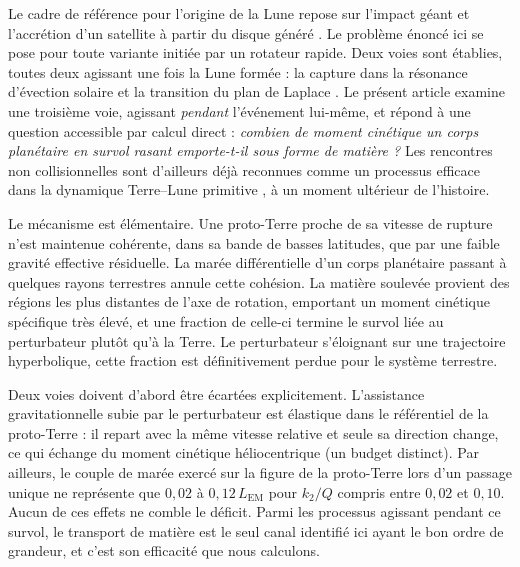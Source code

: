 \documentclass[11pt,a4paper]{article}
\begin{document}
Le cadre de référence pour l'origine de la Lune repose sur l'impact géant et l'accrétion d'un satellite à partir du disque généré \cite{Canup2023, Ida1997, Salmon2012, Kokubo2000}. Le problème énoncé ici se pose pour toute variante initiée par un rotateur rapide. Deux voies sont établies, toutes deux agissant une fois la Lune formée : la capture dans la résonance d'évection solaire et la transition du plan de Laplace \cite{Murray1999, Tremaine2009, Cuk2012}. Le présent article examine une troisième voie, agissant \emph{pendant} l'événement lui-même, et répond à une question accessible par calcul direct : \emph{combien de moment cinétique un corps planétaire en survol rasant emporte-t-il sous forme de matière ?} Les rencontres non collisionnelles sont d'ailleurs déjà reconnues comme un processus efficace dans la dynamique Terre--Lune primitive \cite{Pahlevan2015}, à un moment ultérieur de l'histoire.

Le mécanisme est élémentaire. Une proto-Terre proche de sa vitesse de rupture n'est maintenue cohérente, dans sa bande de basses latitudes, que par une faible gravité effective résiduelle. La marée différentielle d'un corps planétaire passant à quelques rayons terrestres annule cette cohésion. La matière soulevée provient des régions les plus distantes de l'axe de rotation, emportant un moment cinétique spécifique très élevé, et une fraction de celle-ci termine le survol liée au perturbateur plutôt qu'à la Terre. Le perturbateur s'éloignant sur une trajectoire hyperbolique, cette fraction est définitivement perdue pour le système terrestre.

Deux voies doivent d'abord être écartées explicitement. L'assistance gravitationnelle subie par le perturbateur est élastique dans le référentiel de la proto-Terre : il repart avec la même vitesse relative et seule sa direction change, ce qui échange du moment cinétique héliocentrique (un budget distinct). Par ailleurs, le couple de marée exercé sur la figure de la proto-Terre lors d'un passage unique ne représente que $0{,}02$ à $0{,}12\,L_{\mathrm{EM}}$ pour $k_2/Q$ compris entre $0{,}02$ et $0{,}10$. Aucun de ces effets ne comble le déficit. Parmi les processus agissant pendant ce survol, le transport de matière est le seul canal identifié ici ayant le bon ordre de grandeur, et c'est son efficacité que nous calculons.
\end{document}
